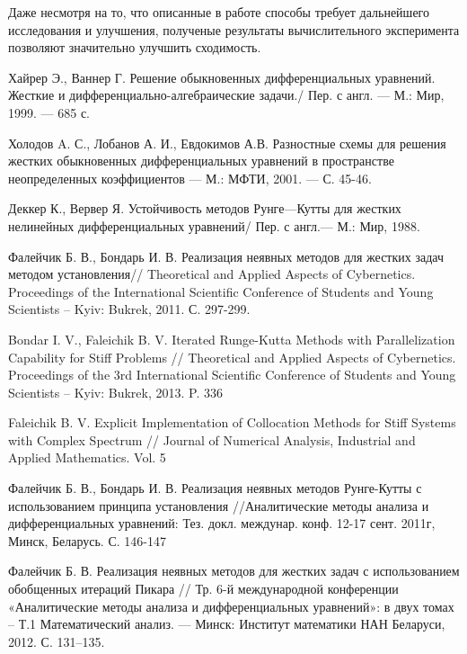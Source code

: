 \documentclass[a4paper,14pt]{extreport}
\begin{document}
Даже несмотря на то, что описанные в работе способы требует дальнейшего исследования и улучшения, полученые результаты вычислительного эксперимента позволяют значительно улучшить сходимость.
  
  
\newpage

\begin{thebibliography}{99}

Хайрер Э., Ваннер Г.  Решение обыкновенных дифференциальных уравнений. Жесткие и дифференциально-алгебраические задачи./ Пер. с англ. — М.: Мир, 1999. — 685 с.

Холодов A. С., Лобанов А. И., Евдокимов А.В. Разностные схемы для решения жестких обыкновенных дифференциальных уравнений в пространстве неопределенных коэффициентов — М.: МФТИ, 2001. — С. 45-46.

Деккер К., Вервер Я. Устойчивость методов Рунге—Кутты для жестких нелинейных дифференциальных уравнений/ Пер. с англ.— М.: Мир, 1988.

Фалейчик Б. В., Бондарь И. В. Реализация неявных методов для жестких задач методом установления// Theoretical and Applied Aspects of Cybernetics. Proceedings of the International Scientific Conference of Students and Young Scientists -- Kyiv: Bukrek, 2011. С. 297-299.

Bondar I. V., Faleichik B. V. Iterated Runge-Kutta Methods with Parallelization Capability for Stiff Problems // Theoretical and Applied Aspects of Cybernetics. Proceedings of the 3rd International Scientific Conference of Students and Young Scientists -- Kyiv: Bukrek, 2013. P. 336 

Faleichik B. V. Explicit Implementation of Collocation Methods for Stiff Systems with Complex Spectrum // Journal of Numerical Analysis, Industrial and Applied Mathematics. Vol. 5

Фалейчик Б. В., Бондарь И. В. Реализация неявных методов Рунге-Кутты с использованием принципа установления //Аналитические методы анализа и дифференциальных уравнений: Тез. докл. междунар. конф. 12-17 сент. 2011г, Минск, Беларусь. С. 146-147

Фалейчик Б. В. Реализация неявных методов для жестких задач с использованием обобщенных итераций Пикара // Тр. 6-й международной конференции «Аналитические методы анализа и дифференциальных уравнений»: в двух томах – Т.1 Математический анализ. — Минск: Институт математики НАН Беларуси, 2012. С. 131–135.


\end{thebibliography}
\end{document}
